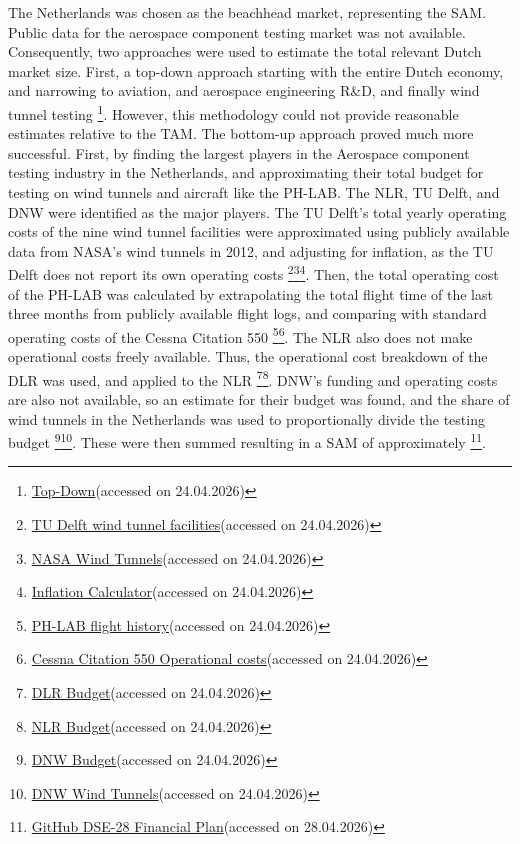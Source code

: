 The Netherlands was chosen as the beachhead market, representing the SAM. Public data for the aerospace component testing market was not available. Consequently, two approaches were used to estimate the total relevant Dutch market size. First, a top-down approach starting with the entire Dutch economy, and narrowing to aviation, and aerospace engineering R\&D, and finally wind tunnel testing \footnote{\href{https://www.iata.org/en/iata-repository/publications/economic-reports/the-value-of-air-transport-to-the-netherlands/}{Top-Down}(accessed on 24.04.2026)}. However, this methodology could not provide reasonable estimates relative to the TAM. The bottom-up approach proved much more successful. First, by finding the largest players in the Aerospace component testing industry in the Netherlands, and approximating their total budget for testing on wind tunnels and aircraft like the PH-LAB. The NLR, TU Delft, and DNW were identified as the major players. The TU Delft's total yearly operating costs of the nine wind tunnel facilities were approximated using publicly available data from NASA's wind tunnels in 2012, and adjusting for inflation, as the TU Delft does not report its own operating costs \footnote{\href{https://www.tudelft.nl/lr/organisatie/afdelingen/flow-physics-and-technology/facilities}{TU Delft wind tunnel facilities}(accessed on 24.04.2026)}\footnote{\href{https://www.nasa.gov/wp-content/uploads/2023/06/nasa-wind-tunnels-final-report-20150813-tagged.pdf}{NASA Wind Tunnels}(accessed on 24.04.2026)}\footnote{\href{https://www.in2013dollars.com/us/inflation/2012?amount=1}{Inflation Calculator}(accessed on 24.04.2026)}. Then, the total operating cost of the PH-LAB was calculated by extrapolating the total flight time of the last three months from publicly available flight logs, and comparing with standard operating costs of the Cessna Citation 550 \footnote{\href{https://www.flightaware.com/live/flight/PHLAB/history}{PH-LAB flight history}(accessed on 24.04.2026)}\footnote{\href{https://www.libertyjet.com/jet-ownership-costs.aspx?jetType=CE-550}{Cessna Citation 550 Operational costs}(accessed on 24.04.2026)}. The NLR also does not make operational costs freely available. Thus, the operational cost breakdown of the DLR was used, and applied to the NLR \footnote{\href{https://www.government.nl/topics/taxation-and-businesses/corporation-tax}{DLR Budget}(accessed on 24.04.2026)}\footnote{\href{https://craft.co/nlr}{NLR Budget}(accessed on 24.04.2026)}. DNW's funding and operating costs are also not available, so an estimate for their budget was found, and the share of wind tunnels in the Netherlands was used to proportionally divide the testing budget \footnote{\href{https://www.lusha.com/business/2bd3ebff838fff84/}{DNW Budget}(accessed on 24.04.2026)}\footnote{\href{https://www.dnw.aero/wind-tunnels/}{DNW Wind Tunnels}(accessed on 24.04.2026)}. These were then summed resulting in a SAM of approximately  \footnote{\href{https://github.com/Teo-Cokonaj/DSE-28/blob/main/docs/excel-files/financial-plan.xlsm}{GitHub DSE-28 Financial Plan}(accessed on 28.04.2026)}. 

